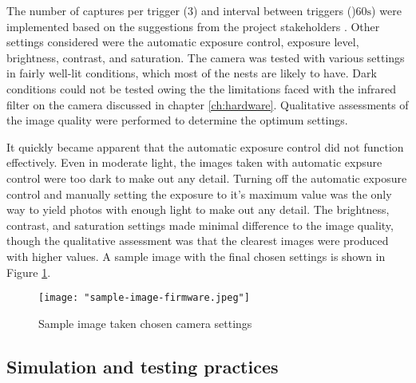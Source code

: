 \documentclass[class=report,11pt,crop=false]{standalone}
\begin{document}
The number of captures per trigger ($\mathrm{3}$) and interval between triggers ()$60 \mathrm{s}$) were implemented based on the suggestions from the project stakeholders \cite{hofmeyer2024private}. Other settings considered were the automatic exposure control, exposure level, brightness, contrast, and saturation. The camera was tested with various settings in fairly well-lit conditions, which most of the nests are likely to have. Dark conditions could not be tested owing the the limitations faced with the infrared filter on the camera discussed in chapter \ref{ch:hardware}. Qualitative assessments of the image quality were performed to determine the optimum settings.

It quickly became apparent that the automatic exposure control did not function effectively. Even in moderate light, the images taken with automatic expsure control were too dark to make out any detail. Turning off the automatic exposure control and manually setting the exposure to it's maximum value was the only way to yield photos with enough light to make out any detail. The brightness, contrast, and saturation settings made minimal difference to the image quality, though the qualitative assessment was that the clearest images were produced with higher values. A sample image with the final chosen settings is shown in Figure \ref{fig:sample-image-firmware}.

\begin{figure}[ht]
    \centering
    \texttt{[image: "sample-image-firmware.jpeg"]}
    \caption{Sample image taken chosen camera settings}
    \label{fig:sample-image-firmware}
\end{figure}


\subsection{Simulation and testing practices}
\end{document}

